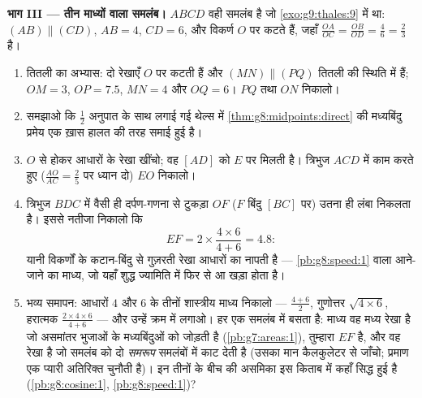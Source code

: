 \begin{problem}
\medskip
\noindent\textbf{भाग III --- तीन माध्यों वाला समलंब।}
$ABCD$ वही समलंब है जो \cref{exo:g9:thales:9} में था:
$(AB) \parallel (CD)$, $AB = 4$, $CD = 6$, और विकर्ण $O$ पर कटते हैं,
जहाँ $\frac{OA}{OC} = \frac{OB}{OD} = \frac{4}{6} = \frac23$ है।
\begin{enumerate}[resume]
  \item तितली का अभ्यास: दो रेखाएँ $O$ पर कटती हैं और
        $(MN) \parallel (PQ)$ तितली की स्थिति में हैं; $OM = 3$,
        $OP = 7.5$, $MN = 4$ और $OQ = 6$। $PQ$ तथा $ON$ निकालो।
  \item समझाओ कि $\frac12$ अनुपात के साथ लगाई गई थेल्स में
        \cref{thm:g8:midpoints:direct} की मध्यबिंदु प्रमेय एक ख़ास
        हालत की तरह समाई हुई है।
  \item $O$ से होकर आधारों के  रेखा खींचो; वह $[AD]$ को $E$ पर
        मिलती है। त्रिभुज $ACD$ में काम करते हुए
        ($\frac{AO}{AC} = \frac25$ पर ध्यान दो) $EO$ निकालो।
  \item त्रिभुज $BDC$ में वैसी ही दर्पण-गणना से टुकड़ा $OF$ ($F$
        बिंदु $[BC]$ पर) उतना ही लंबा निकलता है। इससे नतीजा निकालो
        कि
        \[
        EF = 2 \times \frac{4 \times 6}{4 + 6} = 4.8 :
        \]
        यानी विकर्णों के कटान-बिंदु से गुज़रती  रेखा आधारों का
        \emph{} नापती है --- \cref{pb:g8:speed:1} वाला
        आने-जाने का माध्य, जो यहाँ शुद्ध ज्यामिति में फिर से आ खड़ा
        होता है।
  \item भव्य समापन: आधारों $4$ और $6$ के तीनों शास्त्रीय माध्य
        निकालो ---  $\frac{4+6}{2}$, गुणोत्तर
        $\sqrt{4 \times 6}$, हरात्मक
        $\frac{2 \times 4 \times 6}{4 + 6}$ --- और उन्हें क्रम में
        लगाओ। हर एक समलंब में बसता है:  माध्य वह मध्य रेखा है
        जो असमांतर भुजाओं के मध्यबिंदुओं को जोड़ती है
        (\cref{pb:g7:areas:1}),  तुम्हारा  $EF$
        है, और  वह  रेखा है जो समलंब को दो
        \emph{समरूप} समलंबों में काट देती है (उसका मान कैलकुलेटर से
        जाँचो; प्रमाण एक प्यारी अतिरिक्त चुनौती है)। इन तीनों के बीच
        की असमिका इस किताब में कहाँ सिद्ध हुई है
        (\cref{pb:g8:cosine:1}, \cref{pb:g8:speed:1})?

\end{enumerate}
\end{problem}
